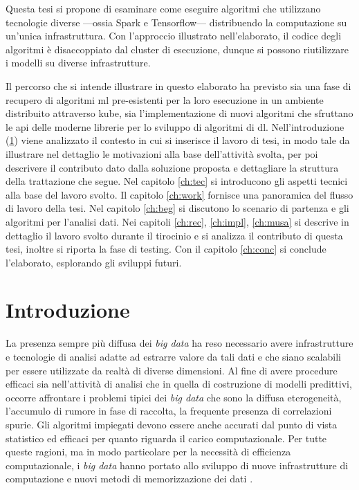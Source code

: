 \documentclass[12pt,a4paper,fleqn,titlepage]{report}
\def\mainmatter{%
    \pagenumbering{arabic}
    \setcounter{page}{1}
}%
\newcommand\blankpage{
    \clearpage
    \null
    \thispagestyle{empty}
    \clearpage
}
\newcommand\bd{\emph{\gls{big data}} }
\begin{document}
Questa tesi si propone di esaminare come eseguire algoritmi che utilizzano tecnologie diverse —ossia Spark e Tensorflow— distribuendo la computazione su un'unica infrastruttura. Con l'approccio illustrato nell'elaborato, il codice degli algoritmi è disaccoppiato dal \gls{cluster} di esecuzione, dunque si possono riutilizzare i modelli su diverse infrastrutture.

Il percorso che si intende illustrare in questo elaborato ha previsto sia una fase di recupero di algoritmi \gls{ml} pre-esistenti per la loro esecuzione in un ambiente distribuito attraverso \gls{kube}, sia l'implementazione di nuovi algoritmi che sfruttano le \gls{api} delle moderne librerie per lo sviluppo di algoritmi di \gls{dl}. Nell'introduzione (\ref{ch:intro}) viene analizzato il contesto in cui si inserisce il lavoro di tesi, in modo tale da illustrare nel dettaglio le motivazioni alla base dell'attività svolta, per poi descrivere il contributo dato dalla soluzione proposta e dettagliare la struttura della trattazione che segue. Nel capitolo \ref{ch:tec} si introducono gli aspetti tecnici alla base del lavoro svolto. Il capitolo \ref{ch:work} fornisce una panoramica del flusso di lavoro della tesi. Nel capitolo \ref{ch:beg} si discutono lo scenario di partenza e gli algoritmi per l'analisi dati. Nei capitoli \ref{ch:rec}, \ref{ch:impl}, \ref{ch:musa} si descrive in dettaglio il lavoro svolto durante il tirocinio e si analizza il contributo di questa tesi, inoltre si riporta la fase di testing. Con il capitolo \ref{ch:conc} si conclude l'elaborato, esplorando gli sviluppi futuri.

\blankpage

\tableofcontents
\listoffigures

\blankpage

\mainmatter

\chapter{Introduzione}\label{ch:intro}
    La presenza sempre più diffusa dei \bd ha reso necessario avere infrastrutture e tecnologie di analisi adatte ad estrarre valore da tali dati e che siano scalabili per essere utilizzate da realtà di diverse dimensioni. Al fine di avere procedure efficaci sia nell'attività di analisi che in quella di costruzione di modelli predittivi, occorre affrontare i problemi tipici dei \bd che sono la diffusa eterogeneità, l'accumulo di rumore in fase di raccolta, la frequente presenza di correlazioni spurie. Gli algoritmi impiegati devono essere anche accurati dal punto di vista statistico ed efficaci per quanto riguarda il carico computazionale. Per tutte queste ragioni, ma in modo particolare per la necessità di efficienza computazionale, i \bd hanno portato allo sviluppo di nuove infrastrutture di computazione e nuovi metodi di memorizzazione dei dati \cite{fan:2014}.
\end{document}
